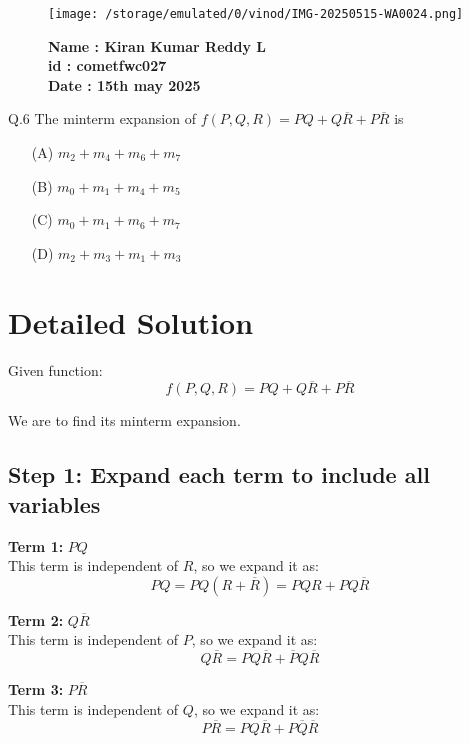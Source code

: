 \documentclass{article}
\begin{document}
\begin{figure}[h!]
    \begin{minipage}{0.45\textwidth}  %
        \texttt{[image: /storage/emulated/0/vinod/IMG-20250515-WA0024.png]}  %
    \end{minipage} \hfill
    \begin{minipage}{0.45\textwidth}  %
        \textbf{Name : Kiran Kumar Reddy L} \\
    \textbf{id : cometfwc027} \\
  \textbf{Date : 15th may 2025}
    \end{minipage}
\end{figure}

\noindent Q.6 \quad The minterm expansion of $f(P, Q, R) = PQ + Q\overline{R} + P\overline{R}$ is
\begin{itemize}
    \item[(A)] $m_2 + m_4 + m_6 + m_7$
    \item[(B)] $m_0 + m_1 + m_4 + m_5$
    \item[(C)] $m_0 + m_1 + m_6 + m_7$
    \item[(D)] $m_2 + m_3 + m_1 + m_3$
\end{itemize}

\section*{Detailed Solution}

Given function:
\[
f(P, Q, R) = PQ + Q\overline{R} + P\overline{R}
\]

We are to find its minterm expansion.

\subsection*{Step 1: Expand each term to include all variables}

\textbf{Term 1:} $PQ$ \\
This term is independent of $R$, so we expand it as:
\[
PQ = PQ(R + \overline{R}) = PQR + PQ\overline{R}
\]

\textbf{Term 2:} $Q\overline{R}$ \\
This term is independent of $P$, so we expand it as:
\[
Q\overline{R} = PQ\overline{R} + \overline{P}Q\overline{R}
\]

\textbf{Term 3:} $P\overline{R}$ \\
This term is independent of $Q$, so we expand it as:
\[
P\overline{R} = PQ\overline{R} + P\overline{Q}\overline{R}
\]
\end{document}
